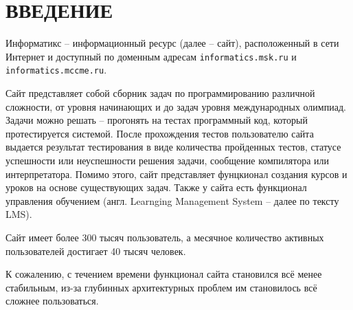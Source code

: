 \chapter{ВВЕДЕНИЕ}


Информатикс -- информационный ресурс (далее -- сайт), расположенный в сети Интернет 
и доступный по доменным адресам \texttt{informatics.msk.ru} и \texttt{informatics.mccme.ru}.

Сайт представляет собой сборник задач по программированию различной сложности, от уровня начинающих и до задач уровня международных олимпиад. 
Задачи можно решать -- прогонять на тестах программный код, который протестируется системой. 
После прохождения тестов пользователю сайта выдается результат тестирования в виде количества пройденных тестов, 
статусе успешности или неуспешности решения задачи, сообщение компилятора или интерпретатора.
Помимо этого, сайт представляет фунцкионал создания курсов и уроков на основе существующих задач.
Также у сайта есть функционал управления обучением (англ. Learnging Management System -- далее по тексту LMS).

Сайт имеет более 300 тысяч пользователь, а месячное количество активных пользователей достигает 40 тысяч человек.

К сожалению, с течением времени функционал сайта становился всё менее стабильным, 
из-за глубинных архитектурных проблем им становилось всё сложнее пользоваться\cite{inf_not_working}.
